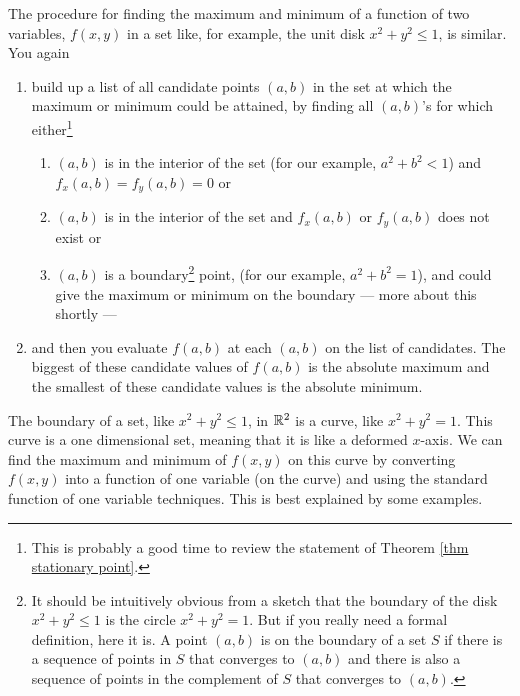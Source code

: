 The procedure for finding the maximum and minimum of a function of two
variables, $f(x,y)$ in a set like, for example, the unit disk $x^2+y^2\le 1$, 
is similar.  You again
\begin{enumerate}
\item build up a list of all candidate points $(a,b)$ in the set at which 
the maximum or minimum could be attained, by finding all $(a,b)$'s for which
either\footnote{This is probably a good time to review the statement of
Theorem \ref{thm stationary point}.}
   \begin{enumerate}
   \item $(a,b)$ is in the interior of the set (for our example, $a^2+b^2<1$)
    and $f_x(a,b)=f_y(a,b)=0$ or
   \item $(a,b)$ is in the interior of the set and  $f_x(a,b)$ or $f_y(a,b)$
        does not exist or
   \item $(a,b)$ is a boundary\footnote{It should be intuitively obvious 
       from a sketch that the boundary of the disk $x^2+y^2\le 1$ is 
       the circle $x^2+y^2=1$.
       But if you really need a formal definition, here it is. A point
       $(a,b)$ is on the boundary of a set $S$ if there is a sequence of
       points in $S$ that converges to $(a,b)$ and there is also a sequence
       of points in the  complement of $S$ that converges to $(a,b)$.} 
     point, (for our example, $a^2+b^2=1$), and 
        could give the maximum or minimum on the boundary --- 
        more about this shortly ---
   \end{enumerate}
\item and then you evaluate $f(a,b)$ at each $(a,b)$ on the list of candidates.
   The biggest of these candidate values of $f(a,b)$ is the absolute maximum 
   and the smallest of these candidate values is the absolute minimum.
\end{enumerate}
The boundary of a set, like $x^2+y^2\le 1$, in $\mathbb{R}^2$ is a curve,
like $x^2+y^2=1$. This curve is a one dimensional set, meaning that it
is like a deformed $x$-axis. We can find the maximum and minimum of $f(x,y)$
on this curve by converting $f(x,y)$ into a function of one variable (on the
curve) and using the standard function of one variable techniques. This is
best explained by some examples.

